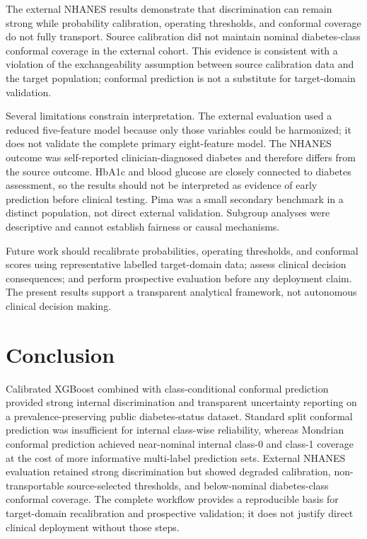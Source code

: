 \documentclass{ieeeaccess}
\begin{document}
The external NHANES results demonstrate that discrimination can remain strong while probability calibration, operating thresholds, and conformal coverage do not fully transport. Source calibration did not maintain nominal diabetes-class conformal coverage in the external cohort. This evidence is consistent with a violation of the exchangeability assumption between source calibration data and the target population; conformal prediction is not a substitute for target-domain validation.

Several limitations constrain interpretation. The external evaluation used a reduced five-feature model because only those variables could be harmonized; it does not validate the complete primary eight-feature model. The NHANES outcome was self-reported clinician-diagnosed diabetes and therefore differs from the source outcome. HbA1c and blood glucose are closely connected to diabetes assessment, so the results should not be interpreted as evidence of early prediction before clinical testing. Pima was a small secondary benchmark in a distinct population, not direct external validation. Subgroup analyses were descriptive and cannot establish fairness or causal mechanisms.

Future work should recalibrate probabilities, operating thresholds, and conformal scores using representative labelled target-domain data; assess clinical decision consequences; and perform prospective evaluation before any deployment claim. The present results support a transparent analytical framework, not autonomous clinical decision making.

\section{Conclusion}
Calibrated XGBoost combined with class-conditional conformal prediction provided strong internal discrimination and transparent uncertainty reporting on a prevalence-preserving public diabetes-status dataset. Standard split conformal prediction was insufficient for internal class-wise reliability, whereas Mondrian conformal prediction achieved near-nominal internal class-0 and class-1 coverage at the cost of more informative multi-label prediction sets. External NHANES evaluation retained strong discrimination but showed degraded calibration, non-transportable source-selected thresholds, and below-nominal diabetes-class conformal coverage. The complete workflow provides a reproducible basis for target-domain recalibration and prospective validation; it does not justify direct clinical deployment without those steps.
\end{document}
